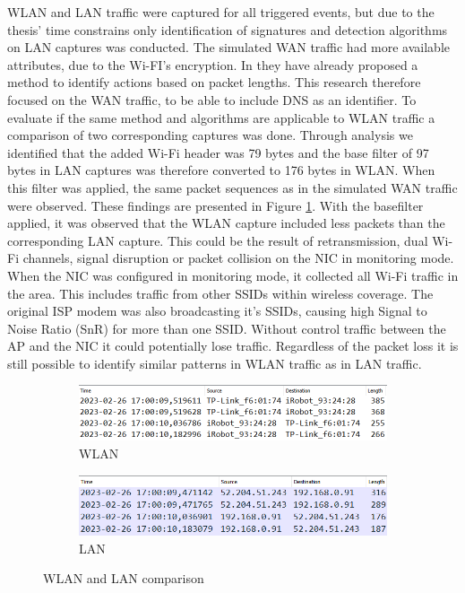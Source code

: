WLAN and LAN traffic were captured for all triggered events, but due to the thesis' time constrains only identification of signatures and detection algorithms on LAN captures was conducted. The simulated WAN traffic had more available attributes, due to the Wi-FI's encryption. In  \cite{pingpong_trimananda2020packet} they have already proposed a method to identify actions based on packet lengths. This research therefore focused on the WAN traffic, to be able to include DNS as an identifier. To evaluate if the same method and algorithms are applicable to WLAN traffic a comparison of two corresponding captures was done. Through analysis we identified that the added Wi-Fi header was 79 bytes and the base filter of 97 bytes in LAN captures was therefore converted to 176 bytes in WLAN. When this filter was applied, the same packet sequences as in the simulated WAN traffic were observed. These findings are presented in Figure \ref{fig:WLANLANHeader}. With the basefilter applied, it was observed that the WLAN capture included less packets than the corresponding LAN capture. This could be the result of retransmission, dual Wi-Fi channels, signal disruption or packet collision on the NIC in monitoring mode. When the NIC was configured in monitoring mode, it collected all Wi-Fi traffic in the area. This includes traffic from other SSIDs within wireless coverage. The original ISP modem was also broadcasting it's SSIDs, causing high Signal to Noise Ratio (SnR) for more than one SSID. Without control traffic between the AP and the NIC it could potentially lose traffic. Regardless of the packet loss it is still possible to identify similar patterns in WLAN traffic as in LAN traffic. 

\begin{figure}[H]
    \centering
    \begin{subfigure}[b]{0.9\textwidth}
        \includegraphics[width=\textwidth]{figures/WLANLANComparison.png}
        \caption{WLAN}
    \end{subfigure}
    \quad
    \begin{subfigure}[b]{0.9\textwidth}
        \includegraphics[width=\textwidth]{figures/LANWLANcomparison.png}
        \caption{LAN}
    \end{subfigure}
    
    \caption{WLAN and LAN comparison}
    \label{fig:WLANLANHeader}
\end{figure}

